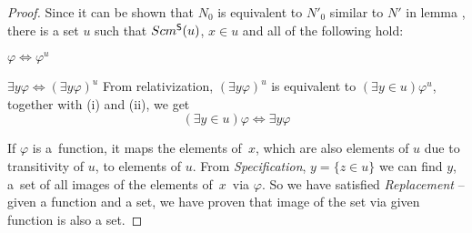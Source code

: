 \begin{proof}
Since it can be shown that $N_0$ is equivalent to $N'_0$ similar to $N'$ in lemma , 
there is a set $u$ such that $Scm^{\sf{S}}(u)$, $x \in u$ and all of the following hold:
\bce[(i)]
\item $\varphi \iff \varphi^{u}$
\item $\exists y \varphi \iff (\exists y \varphi)^{u}$
\ece
From relativization, $(\exists y \varphi)^{u}$ is equivalent to $(\exists y \in u) \varphi^{u}$, together with (i) and (ii), we get
\begin{equation}
(\exists y \in u)\varphi \iff \exists y \varphi
\end{equation}

If $\varphi$ is a~function, %
it maps the elements of~$x$, which are also elements of $u$ due to transitivity of $u$, to elements of $u$. 
From \emph{Specification}, $y = \{ z \in u \}$
we can find $y$, a~set of all images of the elements of~$x$~via $\varphi$. So we have satisfied \emph{Replacement} – given a function and a set, we have proven that image of the set via given function is also a set.
\end{proof} %

